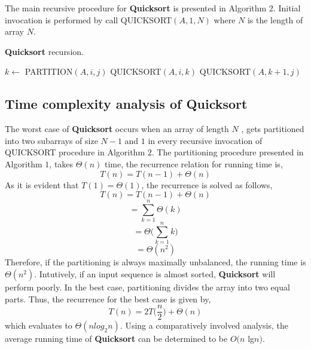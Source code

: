 \indent The main recursive procedure for \textbf{Quicksort} is presented in Algorithm $2$. Initial invocation is performed by call QUICKSORT$(A,1,N)$ where $N$ is the length of array $N$.
\begin{algorithm}
  \caption{\textbf{Quicksort} recursion.}
  \label{algo:ins_sort1}
  \begin{algorithmic}[1]
     \newline
            \State $k \leftarrow$ PARTITION$(A,i,j)$
            \State QUICKSORT$(A,i,k)$
            \State QUICKSORT$(A,k+1,j)$
          \EndIf
     \EndProcedure 
  \end{algorithmic}
\end{algorithm}
\subsection{Time complexity analysis of
Quicksort}
The worst case of \textbf{Quicksort} occurs when an array of length $N$ , gets partitioned into two subarrays of size $N-1$ and $1$ in every recursive invocation of QUICKSORT procedure in Algorithm $2$. The partitioning procedure presented in Algorithm $1$, takes $\Theta(n)$ time, the recurrence relation for running time is,
    $$T(n)=T(n-1)+\Theta(n)$$
As it is evident that $T(1) = \Theta(1)$, the recurrence is
solved as follows,
    $$T(n)=T(n-1)+\Theta(n)$$
    $$=\sum_{k=1}^{n} \Theta(k)$$
 $$=\Theta\Bigg(\sum_{k=1}^{n} k\Bigg)$$
 $$=\Theta(n^2)$$
\indent Therefore, if the partitioning is always maximally unbalanced, the running time is $\Theta(n^2)$. Intutively, if an input sequence is almost sorted, \textbf{Quicksort} will perform poorly. In the best case, partitioning divides the array into two equal parts. Thus, the recurrence for the best case is given by,
$$T(n)=2T\Bigg(\dfrac{n}{2}\Bigg)+\Theta(n)$$
which evaluates to $\Theta(n log_2 n)$. Using a comparatively involved analysis, the average running time of \textbf{Quicksort} can be determined to be $O(n$ lg$ n)$.
